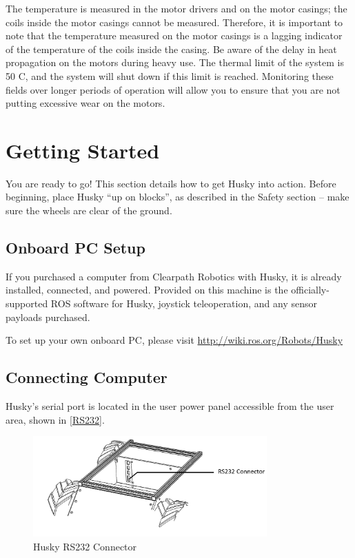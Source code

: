 \documentclass[]{clearpath-latex/clearpath-manual}
\begin{document}
The temperature is measured in the motor drivers and on the motor casings; the coils inside the motor casings cannot be measured.
Therefore, it is important to note that the temperature measured on the motor casings is a lagging indicator of 
the temperature of the coils inside the casing. Be aware of the delay in heat propagation on the motors during heavy use. 
The thermal limit of the system is 50 C\degree, and the system will shut down if this limit is reached.
Monitoring these fields over longer periods of operation will allow you to ensure that you are not putting 
excessive wear on the motors.
\newpage

\section{Getting Started}

You are ready to go! This section details how to get Husky into action.
Before beginning, place Husky “up on blocks”, as described in the Safety section – make sure the wheels are clear of the ground.


\subsection{Onboard PC Setup}

If you purchased a computer from Clearpath Robotics with Husky, it is already installed, connected, and powered. 
Provided on this machine is the officially-supported ROS software for Husky, joystick teleoperation, and any sensor payloads purchased.

To set up your own onboard PC, please visit \url{http://wiki.ros.org/Robots/Husky}


\subsection{Connecting Computer}

Husky’s serial port is located in the user power panel accessible from the user area, shown in \autoref{RS232}.

\begin{figure}[h]
	\centering
	\includegraphics[width=0.8\textwidth]{RS232.png}
	\caption{Husky RS232 Connector}
	\label{RS232}
\end{figure}
\end{document}
